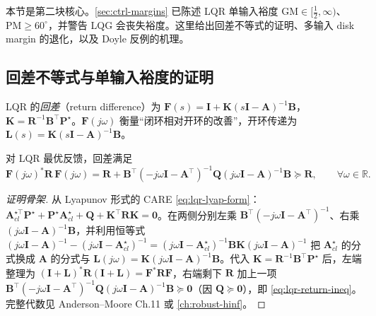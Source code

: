 本节是第二块核心。\cref{sec:ctrl-margins} 已陈述 LQR 单输入裕度 $\mathrm{GM}\in[\tfrac12,\infty)$、$\mathrm{PM}\ge60^\circ$，并警告 LQG 会丧失裕度。这里给出回差不等式的证明、多输入 disk margin 的退化，以及 Doyle 反例的机理。

\subsection{回差不等式与单输入裕度的证明}
\label{sec:lqr-return-diff}

\begin{definition}[回差函数]\label{def:lqr-return-diff}
LQR 的\emph{回差}（return difference）为 $\mathbf F(s)=\mathbf I+\mathbf K(s\mathbf I-\mathbf A)^{-1}\mathbf B$，$\mathbf K=\mathbf R^{-1}\mathbf B^\top\mathbf P^\star$。$\mathbf F(j\omega)$ 衡量“闭环相对开环的改善”，开环传递为 $\mathbf L(s)=\mathbf K(s\mathbf I-\mathbf A)^{-1}\mathbf B$。
\end{definition}

\begin{theorem}\label{thm:lqr-kalman-ineq}
对 LQR 最优反馈，回差满足
\begin{equation}
  \mathbf F(j\omega)^*\mathbf R\,\mathbf F(j\omega)=\mathbf R+\mathbf B^\top(-j\omega\mathbf I-\mathbf A^\top)^{-1}\mathbf Q(j\omega\mathbf I-\mathbf A)^{-1}\mathbf B\succeq\mathbf R,\qquad\forall\omega\in\mathbb R.
  \label{eq:lqr-return-ineq}
\end{equation}
\end{theorem}

\begin{proof}[证明骨架]
从 Lyapunov 形式的 CARE \cref{eq:lqr-lyap-form}：$\mathbf A_{cl}^{\star\top}\mathbf P^\star+\mathbf P^\star\mathbf A_{cl}^\star+\mathbf Q+\mathbf K^\top\mathbf R\mathbf K=\mathbf0$。在两侧分别左乘 $\mathbf B^\top(-j\omega\mathbf I-\mathbf A^\top)^{-1}$、右乘 $(j\omega\mathbf I-\mathbf A)^{-1}\mathbf B$，并利用恒等式 $(j\omega\mathbf I-\mathbf A)^{-1}-(j\omega\mathbf I-\mathbf A_{cl}^\star)^{-1}=(j\omega\mathbf I-\mathbf A_{cl}^\star)^{-1}\mathbf B\mathbf K(j\omega\mathbf I-\mathbf A)^{-1}$ 把 $\mathbf A_{cl}^\star$ 的分式换成 $\mathbf A$ 的分式与 $\mathbf L(j\omega)=\mathbf K(j\omega\mathbf I-\mathbf A)^{-1}\mathbf B$。代入 $\mathbf K=\mathbf R^{-1}\mathbf B^\top\mathbf P^\star$ 后，左端整理为 $(\mathbf I+\mathbf L)^*\mathbf R(\mathbf I+\mathbf L)=\mathbf F^*\mathbf R\mathbf F$，右端剩下 $\mathbf R$ 加上一项 $\mathbf B^\top(-j\omega\mathbf I-\mathbf A^\top)^{-1}\mathbf Q(j\omega\mathbf I-\mathbf A)^{-1}\mathbf B\succeq\mathbf0$（因 $\mathbf Q\succeq\mathbf0$），即 \cref{eq:lqr-return-ineq}。完整代数见 Anderson--Moore Ch.11\cite{anderson2007optimal} 或 \cref{ch:robust-hinf}。
\end{proof}

